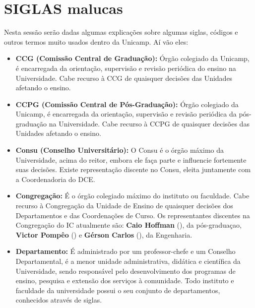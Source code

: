 
\section{SIGLAS malucas}

Nesta sessão serão dadas algumas explicações sobre algumas siglas, códigos
e outros termos muito usados dentro da Unicamp. Aí vão eles:

\begin{itemize}
    \item  \textbf{CCG (Comissão Central de Graduação):} Órgão colegiado da
        Unicamp, é encarregada da orientação, supervisão e revisão periódica do
        ensino na Universidade. Cabe recurso à CCG de quaisquer decisões das
        Unidades afetando o ensino.

    \item  \textbf{CCPG (Comissão Central de Pós-Graduação):} Órgão colegiado da
        Unicamp, é encarregada da orientação, supervisão e revisão periódica da
        pós-graduação na Universidade. Cabe recurso à CCPG de quaisquer decisões
        das Unidades afetando o ensino.

    \item  \textbf{Consu (Conselho Universitário):} O Consu é o órgão máximo da
        Universidade, acima do reitor, embora ele faça parte e influencie
        fortemente suas decisões.  Existe representação discente no Consu,
        eleita juntamente com a Coordenadoria do DCE.

    \item  \textbf{Congregação:} É o órgão colegiado máximo do instituto ou
        faculdade.  Cabe recurso à Congregação da Unidade de Ensino de quaisquer
        decisões dos Departamentos e das Coordenações de Curso. Os
        representantes discentes na Congregação do IC atualmente são:
        \textbf{Caio Hoffman} (), da pós-graduaçao,
        \textbf{Victor Pompêo} () e \textbf{Gérson
        Carlos} (), da Engenharia.

    \item  \textbf{Departamento:} É administrado por um professor-chefe e um
        Conselho Departamental, é a menor unidade administrativa, didática e
        científica da Universidade, sendo responsável pelo desenvolvimento dos
        programas de ensino, pesquisa e extensão dos serviços à comunidade. Todo
        instituto e faculdade da universidade possui o seu conjunto de
        departamentos, conhecidos através de siglas.


\end{itemize}
